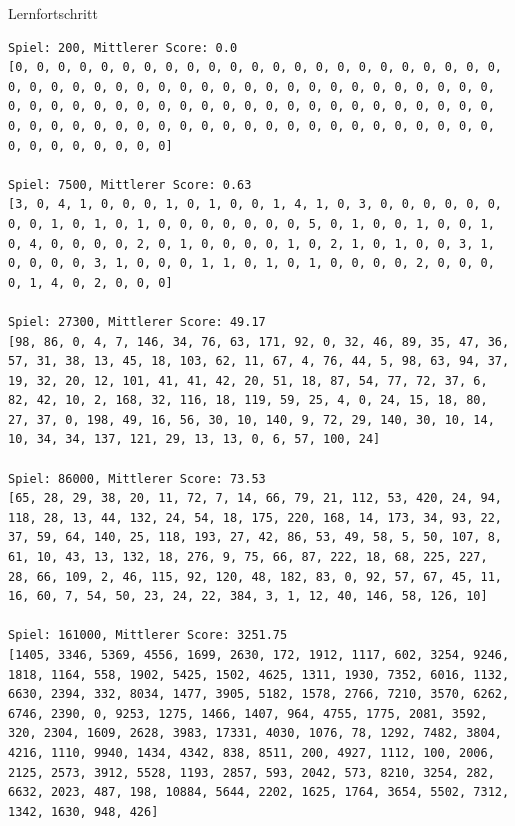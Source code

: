 \begin{frame}[fragile]{Lernfortschritt}
\begin{verbatim}
Spiel: 200, Mittlerer Score: 0.0
[0, 0, 0, 0, 0, 0, 0, 0, 0, 0, 0, 0, 0, 0, 0, 0, 0, 0, 0, 0, 0, 0, 0, 0, 0, 0, 0, 0, 0, 0, 0, 0, 0, 0, 0, 0, 0, 0, 0, 0, 0, 0, 0, 0, 0, 0, 0, 0, 0, 0, 0, 0, 0, 0, 0, 0, 0, 0, 0, 0, 0, 0, 0, 0, 0, 0, 0, 0, 0, 0, 0, 0, 0, 0, 0, 0, 0, 0, 0, 0, 0, 0, 0, 0, 0, 0, 0, 0, 0, 0, 0, 0, 0, 0, 0, 0, 0, 0, 0, 0]

Spiel: 7500, Mittlerer Score: 0.63
[3, 0, 4, 1, 0, 0, 0, 1, 0, 1, 0, 0, 1, 4, 1, 0, 3, 0, 0, 0, 0, 0, 0, 0, 0, 1, 0, 1, 0, 1, 0, 0, 0, 0, 0, 0, 0, 5, 0, 1, 0, 0, 1, 0, 0, 1, 0, 4, 0, 0, 0, 0, 2, 0, 1, 0, 0, 0, 0, 1, 0, 2, 1, 0, 1, 0, 0, 3, 1, 0, 0, 0, 0, 3, 1, 0, 0, 0, 1, 1, 0, 1, 0, 1, 0, 0, 0, 0, 2, 0, 0, 0, 0, 1, 4, 0, 2, 0, 0, 0]

Spiel: 27300, Mittlerer Score: 49.17
[98, 86, 0, 4, 7, 146, 34, 76, 63, 171, 92, 0, 32, 46, 89, 35, 47, 36, 57, 31, 38, 13, 45, 18, 103, 62, 11, 67, 4, 76, 44, 5, 98, 63, 94, 37, 19, 32, 20, 12, 101, 41, 41, 42, 20, 51, 18, 87, 54, 77, 72, 37, 6, 82, 42, 10, 2, 168, 32, 116, 18, 119, 59, 25, 4, 0, 24, 15, 18, 80, 27, 37, 0, 198, 49, 16, 56, 30, 10, 140, 9, 72, 29, 140, 30, 10, 14, 10, 34, 34, 137, 121, 29, 13, 13, 0, 6, 57, 100, 24]

Spiel: 86000, Mittlerer Score: 73.53
[65, 28, 29, 38, 20, 11, 72, 7, 14, 66, 79, 21, 112, 53, 420, 24, 94, 118, 28, 13, 44, 132, 24, 54, 18, 175, 220, 168, 14, 173, 34, 93, 22, 37, 59, 64, 140, 25, 118, 193, 27, 42, 86, 53, 49, 58, 5, 50, 107, 8, 61, 10, 43, 13, 132, 18, 276, 9, 75, 66, 87, 222, 18, 68, 225, 227, 28, 66, 109, 2, 46, 115, 92, 120, 48, 182, 83, 0, 92, 57, 67, 45, 11, 16, 60, 7, 54, 50, 23, 24, 22, 384, 3, 1, 12, 40, 146, 58, 126, 10]

Spiel: 161000, Mittlerer Score: 3251.75
[1405, 3346, 5369, 4556, 1699, 2630, 172, 1912, 1117, 602, 3254, 9246, 1818, 1164, 558, 1902, 5425, 1502, 4625, 1311, 1930, 7352, 6016, 1132, 6630, 2394, 332, 8034, 1477, 3905, 5182, 1578, 2766, 7210, 3570, 6262, 6746, 2390, 0, 9253, 1275, 1466, 1407, 964, 4755, 1775, 2081, 3592, 320, 2304, 1609, 2628, 3983, 17331, 4030, 1076, 78, 1292, 7482, 3804, 4216, 1110, 9940, 1434, 4342, 838, 8511, 200, 4927, 1112, 100, 2006, 2125, 2573, 3912, 5528, 1193, 2857, 593, 2042, 573, 8210, 3254, 282, 6632, 2023, 487, 198, 10884, 5644, 2202, 1625, 1764, 3654, 5502, 7312, 1342, 1630, 948, 426]
\end{verbatim}
\end{frame}


